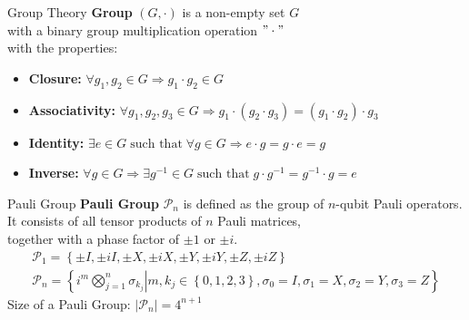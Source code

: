 \documentclass[english,aspectratio=169]{tumbeamer}
\DeclareMathOperator{\suchthat}{\text{ such that }}
\begin{document}
    \begin{frame}{Group Theory}
        \textbf{Group} \((G,\cdot)\) is a non-empty set \(G\) \\
        with a binary group multiplication operation \("\cdot"\) \\
        with the properties: \newline
        \begin{itemize}
            \setlength{\itemsep}{1.25\baselineskip}
            \item \textbf{Closure:}
            \(\forall g_1,g_2\in G\Longrightarrow g_1\cdot g_2\in G\)
            \item \textbf{Associativity:}
            \(\forall g_1,g_2,g_3\in G\Longrightarrow g_1\cdot(g_2\cdot g_3)=(g_1\cdot g_2)\cdot g_3\)
            \item \textbf{Identity:}
            \(\exists e\in G\suchthat\forall g\in G\Longrightarrow e\cdot g=g\cdot e=g\)
            \item \textbf{Inverse:}
            \(\forall g\in G\Longrightarrow\exists g^{-1}\in G\suchthat g\cdot g^{-1}=g^{-1}\cdot g=e\)
        \end{itemize}
        \vspace*{4mm}

        {\footnotesize
        \cite*{01_QuantumComputationAndQuantumInformation}
        }
    \end{frame}

    \begin{frame}{Pauli Group}
        \textbf{Pauli Group}
        \(\mathcal{P}_n\)
        is defined as the group of \(n\)-qubit Pauli operators. \\
        It consists of all tensor products of \(n\) Pauli matrices, \\
        together with a phase factor of \(\pm 1\) or \(\pm i\).
        \begin{gather*}
            \mathcal{P}_1=\left\{
            \pm I,\pm iI,
            \pm X,\pm iX,
            \pm Y,\pm iY,
            \pm Z,\pm iZ
            \right\} \\
            \mathcal{P}_n
            =\left\{
            \left.
            i^m\bigotimes_{j=1}^n\sigma_{k_j}
            \right|
            m,k_j\in\left\{0,1,2,3\right\},
            \sigma_0=I,
            \sigma_1=X,
            \sigma_2=Y,
            \sigma_3=Z
            \right\}
        \end{gather*}
        \newline
        Size of a Pauli Group:
        \(\left|\mathcal{P}_n\right|=4^{n+1}\)
        \vspace*{10mm}

        {\footnotesize
        \cite*{02_ImprovedSimulationOfStabilizerCircuits}
         \\
        \cite*{01_QuantumComputationAndQuantumInformation}
        }
    \end{frame}
\end{document}
